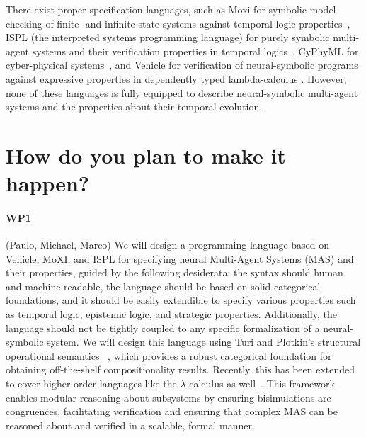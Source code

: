 \documentclass[11pt]{article}
\begin{document}
There exist proper specification languages, such as Moxi for symbolic model
checking of finite- and infinite-state systems against temporal logic
properties~\cite{Rozier+2024}, ISPL (the interpreted systems
programming language) for purely symbolic multi-agent systems and
their verification properties in temporal logics~\cite{LomuscioQR17},
CyPhyML for cyber-physical systems~\cite{Simko+13}, and Vehicle for
verification of neural-symbolic programs against expressive properties
in dependently typed lambda-calculus \cite{Daggitt+24}. However, none
of these languages is fully equipped to describe neural-symbolic
multi-agent systems and the properties about their temporal evolution.


\section{How do you plan to make it happen?}




\paragraph{WP1} (Paulo, Michael, Marco)
We will design a programming language based on Vehicle, MoXI, and ISPL for
specifying neural Multi-Agent Systems (MAS) and their properties, guided by the
following desiderata: the syntax should human and machine-readable, the language
should be based on solid categorical foundations, and it should be easily
extendible to specify various properties such as temporal logic, epistemic
logic, and strategic properties. Additionally, the language should not be
tightly coupled to any specific formalization of a neural-symbolic system. We
will design this language using Turi and Plotkin's structural operational
semantics ~\cite{TuriP97}, which provides a robust categorical foundation for
obtaining off-the-shelf compositionality results. Recently, this has been
extended to cover higher order languages like the $\lambda$-calculus as
well~\cite{GoncharovMSTU23}. This framework enables modular reasoning about
subsystems by ensuring bisimulations are congruences, facilitating verification
and ensuring that complex MAS can be reasoned about and verified in a scalable,
formal manner.
\end{document}
